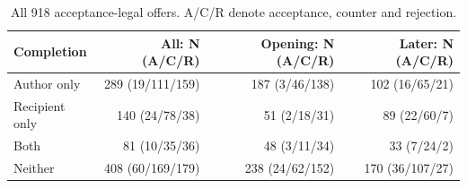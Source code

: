 \begin{table}[ht]\centering\small
\begin{tabular}{@{}lrrr@{}}\toprule
Completion & All: N (A/C/R) & Opening: N (A/C/R) & Later: N (A/C/R)\\\midrule
Author only & 289 (19/111/159) & 187 (3/46/138) & 102 (16/65/21)\\
Recipient only & 140 (24/78/38) & 51 (2/18/31) & 89 (22/60/7)\\
Both & 81 (10/35/36) & 48 (3/11/34) & 33 (7/24/2)\\
Neither & 408 (60/169/179) & 238 (24/62/152) & 170 (36/107/27)\\
\bottomrule\end{tabular}
\caption{All 918 acceptance-legal offers. A/C/R denote acceptance, counter and rejection.}\label{tab:offerfull}\end{table}
